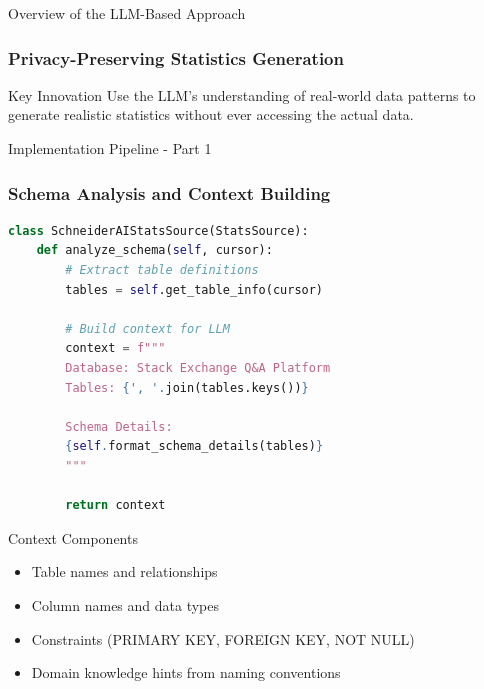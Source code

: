 \documentclass{beamer}
\begin{document}
\begin{frame}{Overview of the LLM-Based Approach}
\frametitle{Privacy-Preserving Statistics Generation}

\begin{center}
\end{center}

\vspace{0.5cm}

\begin{block}{Key Innovation}
Use the LLM's understanding of real-world data patterns to generate realistic statistics without ever accessing the actual data.
\end{block}


\end{frame}

\begin{frame}[fragile]{Implementation Pipeline - Part 1}
\frametitle{Schema Analysis and Context Building}

\begin{lstlisting}[language=Python]
class SchneiderAIStatsSource(StatsSource):
    def analyze_schema(self, cursor):
        # Extract table definitions
        tables = self.get_table_info(cursor)
        
        # Build context for LLM
        context = f"""
        Database: Stack Exchange Q&A Platform
        Tables: {', '.join(tables.keys())}
        
        Schema Details:
        {self.format_schema_details(tables)}
        """
        
        return context
\end{lstlisting}

\begin{block}{Context Components}
\begin{itemize}
    \item Table names and relationships
    \item Column names and data types
    \item Constraints (PRIMARY KEY, FOREIGN KEY, NOT NULL)
    \item Domain knowledge hints from naming conventions
\end{itemize}
\end{block}

\end{frame}
\end{document}
